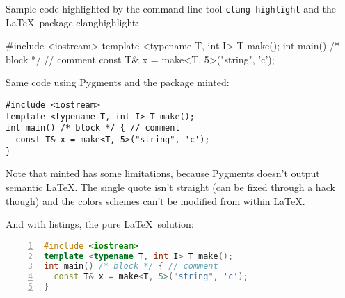 \documentclass{article}
\newcommand\pkg[1]{\textsf{#1}}
\begin{document}
Sample code highlighted by the command line tool \verb|clang-highlight| and the
\LaTeX\ package \pkg{clanghighlight}:
\begin{cxx}[numbers=left]
#include <iostream>
template <typename T, int I> T make();
int main() /* block */ { // comment
  const T& x = make<T, 5>("string", 'c');
}
\end{cxx}

Same code using \textsf{Pygments} and the package \pkg{minted}:
\begin{verbatim}
#include <iostream>
template <typename T, int I> T make();
int main() /* block */ { // comment
  const T& x = make<T, 5>("string", 'c');
}
\end{verbatim}
Note that \pkg{minted} has some limitations, because \textsf{Pygments} doesn't
output semantic \LaTeX.  The single quote isn't straight (can be fixed through
a hack though) and the colors schemes can't be modified from within \LaTeX.

And with \pkg{listings}, the pure \LaTeX\ solution:

\begin{lstlisting}[language=c++,numbers=left]
#include <iostream>
template <typename T, int I> T make();
int main() /* block */ { // comment
  const T& x = make<T, 5>("string", 'c');
}
\end{lstlisting}
\end{document}
